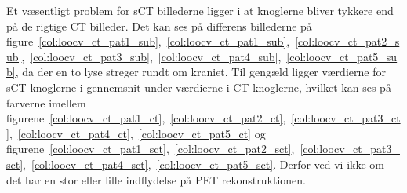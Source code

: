 Et væsentligt problem for sCT billederne ligger i at knoglerne bliver tykkere end på de rigtige CT billeder. Det kan ses på differens billederne på figure~\ref{col:loocv_ct_pat1_sub},~\ref{col:loocv_ct_pat1_sub},~\ref{col:loocv_ct_pat2_sub},~\ref{col:loocv_ct_pat3_sub},~\ref{col:loocv_ct_pat4_sub},~\ref{col:loocv_ct_pat5_sub}, da der en to lyse streger rundt om kraniet. Til gengæld ligger værdierne for sCT knoglerne i gennemsnit under værdierne i CT knoglerne, hvilket kan ses på farverne imellem figurene~\ref{col:loocv_ct_pat1_ct},~\ref{col:loocv_ct_pat2_ct},~\ref{col:loocv_ct_pat3_ct},~\ref{col:loocv_ct_pat4_ct},~\ref{col:loocv_ct_pat5_ct} og figurene~\ref{col:loocv_ct_pat1_sct},~\ref{col:loocv_ct_pat2_sct},~\ref{col:loocv_ct_pat3_sct},~\ref{col:loocv_ct_pat4_sct},~\ref{col:loocv_ct_pat5_sct}. Derfor ved vi ikke om det har en stor eller lille indflydelse på PET rekonstruktionen.

